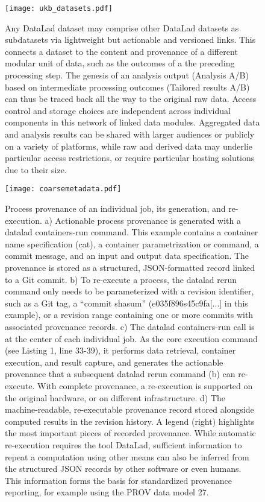 \begin{figure}
	\centering
	\texttt{[image: ukb\_datasets.pdf]}
	\caption[Overview of DataLad dataset linkage through processing and reuse]{Any DataLad dataset may comprise other DataLad datasets as subdatasets via lightweight but actionable and versioned links. This connects a dataset to the content and provenance of a different modular unit of data, such as the outcomes of a the preceding processing step. The genesis of an analysis output (Analysis A/B) based on intermediate processing outcomes (Tailored results A/B) can thus be traced back all the way to the original raw data. Access control and storage choices are independent across individual components in this network of linked data modules. Aggregated data and analysis results can be shared with larger audiences or publicly on a variety of platforms, while raw and derived data may underlie particular access restrictions, or require particular hosting solutions due to their size.}
	\label{fig:fairly_datasets}
\end{figure}

\begin{figure}
	\centering
	\texttt{[image: coarsemetadata.pdf]}
	\caption[Process provenance of an individual job]{Process provenance of an individual job, its generation, and re-execution. a) Actionable process provenance is generated with a datalad containers-run command. This example contains a container name specification (cat), a container parametrization or command, a commit message, and an input and output data specification. The provenance is stored as a structured, JSON-formatted record linked to a Git commit. b) To re-execute a process, the datalad rerun command only needs to be parameterized with a revision identifier, such as a Git tag, a “commit shasum” (e035f896s45c9fa[...] in this example), or a revision range containing one or more commits with associated provenance records. c) The datalad containers-run call is at the center of each individual job. As the core execution command (see Listing 1, line 33-39), it performs data retrieval, container execution, and result capture, and generates the actionable provenance that a subsequent datalad rerun command (b) can re-execute. With complete provenance, a re-execution is supported on the original hardware, or on different infrastructure. d) The machine-readable, re-executable provenance record stored alongside computed results in the revision history. A legend (right) highlights the most important pieces of recorded provenance. While automatic re-execution requires the tool DataLad, sufficient information to repeat a computation using other means can also be inferred from the structured JSON records by other software or even humans. This information forms the basis for standardized provenance reporting, for example using the PROV data model 27.}
	\label{fig:fairly_metadata}
\end{figure}

